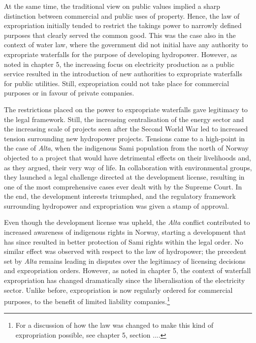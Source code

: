 At the same time, the traditional view on public values implied a sharp distinction between commercial and public uses of property. Hence, the law of expropriation initially tended to restrict the takings power to narrowly defined purposes that clearly served the common good. This was the case also in the context of water law, where the government did not initial have any authority to expropriate waterfalls for the purpose of developing hydropower. However, as noted in chapter 5, the increasing focus on electricity production as a public service resulted in the introduction of new authorities to expropriate waterfalls for public utilities. Still, expropriation could not take place for commercial purposes or in favour of private companies.

The restrictions placed on the power to expropriate waterfalls gave legitimacy to the legal framework. Still, the increasing centralisation of the energy sector and the increasing scale of projects seen after the Second World War led to increased tension surrounding new hydropower projects. Tensions came to a high-point in the case of {\it Alta}, when the indigenous Sami population from the north of Norway objected to a project that would have detrimental effects on their livelihoods and, as they argued, their very way of life. In collaboration with environmental groups, they launched a legal challenge directed at the development license, resulting in one of the most comprehensive cases ever dealt with by the Supreme Court. In the end, the development interests triumphed, and the regulatory framework surrounding hydropower and expropriation was given a stamp of approval. 

Even though the development license was upheld, the {\it Alta} conflict contributed to increased awareness of indigenous rights in Norway, starting a development that has since resulted in better protection of Sami rights within the legal order. No similar effect was observed with respect to the law of hydropower; the precedent set by {\it Alta} remains leading in disputes over the legitimacy of licensing decisions and expropriation orders. However, as noted in chapter 5, the context of waterfall expropriation has changed dramatically since the liberalisation of the electricity sector. Unlike before, expropriation is now regularly ordered for commercial purposes, to the benefit of limited liability companies.\footnote{For a discussion of how the law was changed to make this kind of expropriation possible, see chapter 5, section ....}

